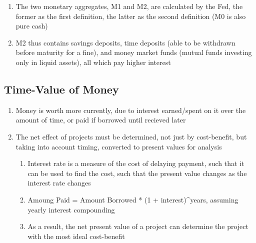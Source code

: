 \begin{enumerate}
\begin{enumerate}
\item The two monetary aggregates, M1 and M2, are calculated by the Fed, the former as the first definition, the latter as the second definition (M0 is also pure cash)
\item M2 thus contains savings deposits, time deposits (able to be withdrawn before maturity for a fine), and money market funds (mutual funds investing only in liquid assets), all which pay higher interest
\end{enumerate}
\end{enumerate}

\subsection{Time-Value of Money}
\begin{enumerate}
\item Money is worth more currently, due to interest earned/spent on it over the amount of time, or paid if borrowed until recieved later
\item The net effect of projects must be determined, not just by cost-benefit, but taking into account timing, converted to present values for analysis
\begin{enumerate}
\item Interest rate is a measure of the cost of delaying payment, such that it can be used to find the cost, such that the present value changes as the interest rate changes
\item Amoung Paid = Amount Borrowed * (1 + interest)^years, assuming yearly interest compounding
\item As a result, the net present value of a project can determine the project with the most ideal cost-benefit
\end{enumerate}
\end{enumerate}

